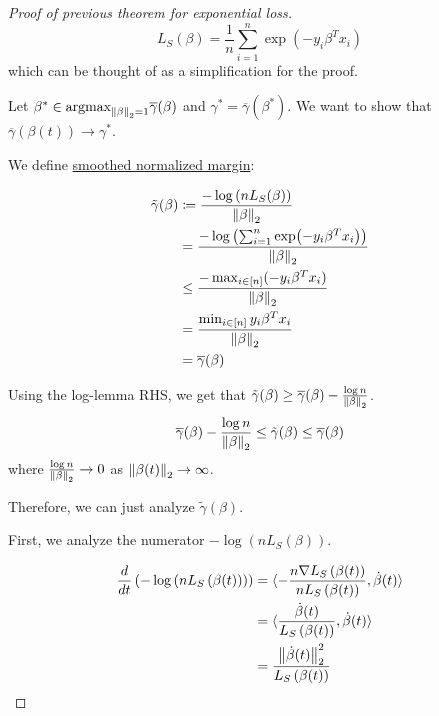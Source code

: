 \begin{proof}[Proof of previous theorem for exponential loss]
    \[
        L_S (\beta) = \frac{1}{n} \sum_{i=1}^n \exp \left(-y_i \beta^T x_i\right)  
    \]
    which can be thought of as a simplification for the proof. 

    Let \(\beta^* \in \text{argmax}_{\norm{\beta}_2 = 1} \overline{\gamma} (\beta)\) and 
    \(\gamma^* = \overline{\gamma}(\beta^*)\). We want to show that \(\overline{\gamma} \left( \beta(t)\right) \to \gamma^*\). 

    We define \underline{smoothed normalized margin}: 

    \begin{align*}
        \tilde{\gamma} (\beta) &\coloneqq \frac{-\log \left(n L_S (\beta)\right)}{\norm{\beta}_2} \\ 
        &= \frac{- \log \left( \sum_{i=1}^n \exp (-y_i \beta^T x_i) \right)}{\norm{\beta}_2} \\ 
        &\leq \frac{- \max_{i \in [n]} (-y_i \beta^T x_i)}{\norm{\beta}_2} \\ 
        &= \frac{ \min_{i \in [n]} y_i \beta^T x_i}{\norm{\beta}_2} \\ 
        &= \overline{\gamma} (\beta)
    \end{align*}

    Using the log-lemma RHS, we get that \(  \tilde{\gamma}(\beta) \geq \overline{\gamma}(\beta) - \frac{\log n}{\norm{\beta}_2}  \). 
    \[
        \overline{\gamma} (\beta) - \frac{\log n}{\norm{\beta}_2} \leq \tilde{\gamma} (\beta) 
        \leq \overline{\gamma} (\beta)    
    \]
    where \(\frac{\log n}{\norm{\beta}_2} \to 0\) as \(\norm{\beta(t)}_2 \to \infty\).
    
    Therefore, we can just analyze \(\tilde{\gamma}(\beta)\). 


    First, we analyze the numerator \(- \log \left(n L_S (\beta) \right) \). 

    \begin{align*}
        \frac{d}{dt} \left(   - \log \left( n L_S \left(  \beta (t) \right)
        \right) \right) &= \langle - \frac{n \nabla L_S \left(\beta(t)\right)}{n L_S \left(\beta(t)\right)}, \dot{\beta}(t) \rangle \\ 
        &= \langle   \frac{\dot{\beta}(t)}{L_S \left(\beta (t)\right)}  , \dot{\beta}(t) \rangle \\ 
        &= \frac{\norm{\dot{\beta}(t)}_2^2}{L_S \left(\beta (t)\right)}         
    \end{align*}


\end{proof}
